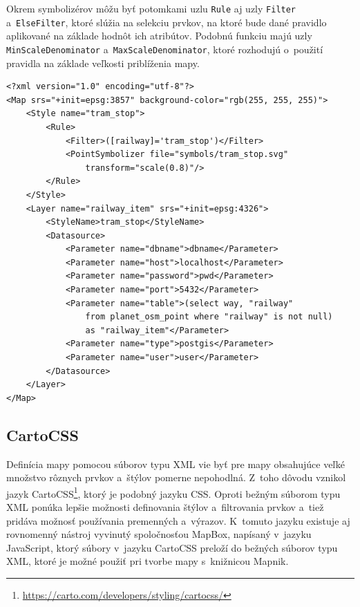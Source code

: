 Okrem symbolizérov môžu byť potomkami uzlu {\tt Rule} aj uzly {\tt Filter} a~{\tt ElseFilter}, ktoré slúžia na selekciu prvkov, na ktoré bude dané pravidlo aplikované na základe hodnôt ich atribútov. Podobnú funkciu majú uzly {\tt MinScaleDenominator} a~{\tt MaxScaleDenominator}, ktoré rozhodujú o~použití pravidla na základe veľkosti priblíženia mapy.

\begin{lstlisting}[frame=single,aboveskip=20pt,belowskip=20pt,framesep=10pt,caption={Príklad súboru typu XML definujúci mapu knižnice Mapnik. Vytvára vrstvu so získaním dát z~databázy s~rošírením PostGIS, na ktoré uplatňuje štýl. Z~databázy získava všetky prvky typu bod, ktoré majú nenulovú hodnotu atribútu {\it railway} a~v štýle prebieha filtrovanie, pomocou ktorého sú vybraté len žiadané prvky -- zastávky električiek. Na tieto je potom aplikovaný symbolizér.},label={xml_code}]
<?xml version="1.0" encoding="utf-8"?>
<Map srs="+init=epsg:3857" background-color="rgb(255, 255, 255)">
    <Style name="tram_stop">
        <Rule>
            <Filter>([railway]='tram_stop')</Filter>
            <PointSymbolizer file="symbols/tram_stop.svg" 
                transform="scale(0.8)"/>
        </Rule>
    </Style>
    <Layer name="railway_item" srs="+init=epsg:4326">
        <StyleName>tram_stop</StyleName>
        <Datasource>
            <Parameter name="dbname">dbname</Parameter>
            <Parameter name="host">localhost</Parameter>
            <Parameter name="password">pwd</Parameter>
            <Parameter name="port">5432</Parameter>
            <Parameter name="table">(select way, "railway" 
                from planet_osm_point where "railway" is not null) 
                as "railway_item"</Parameter>
            <Parameter name="type">postgis</Parameter>
            <Parameter name="user">user</Parameter>
        </Datasource>
    </Layer>
</Map>
\end{lstlisting}


\subsection*{CartoCSS}
Definícia mapy pomocou súborov typu XML vie byť pre mapy obsahujúce veľké množstvo rôznych prvkov a~štýlov pomerne nepohodlná. Z~toho dôvodu vznikol jazyk CartoCSS\footnote{\url{https://carto.com/developers/styling/cartocss/}}, ktorý je podobný jazyku CSS. Oproti bežným súborom typu XML ponúka lepšie možnosti definovania štýlov a~filtrovania prvkov a~tiež pridáva možnosť používania premenných a~výrazov. K~tomuto jazyku existuje aj rovnomenný nástroj vyvinutý spoločnosťou MapBox, napísaný v~jazyku JavaScript, ktorý súbory v~jazyku CartoCSS preloží do bežných súborov typu XML, ktoré je možné použiť pri tvorbe mapy s~knižnicou Mapnik.

